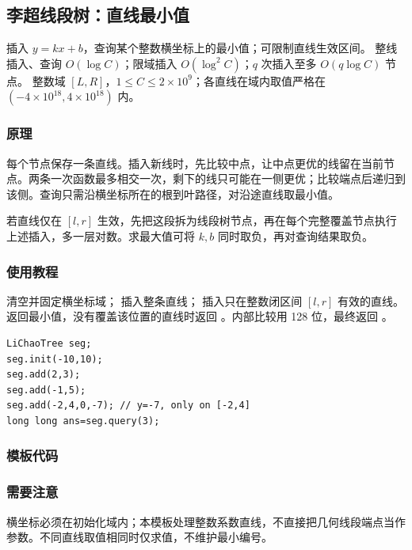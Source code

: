 \subsection{李超线段树：直线最小值}
\label{ds:li-chao}
\AlgorithmInfo
    {插入 $y=kx+b$，查询某个整数横坐标上的最小值；可限制直线生效区间。}
    {整线插入、查询 $O(\log C)$；限域插入 $O(\log^2 C)$；$q$ 次插入至多 $O(q\log C)$ 节点。}
    {整数域 $[L,R]$，$1\le C\le2\times10^9$；各直线在域内取值严格在 $(-4\times10^{18},4\times10^{18})$ 内。}
\subsubsection*{原理}
每个节点保存一条直线。插入新线时，先比较中点，让中点更优的线留在当前节点。两条一次函数最多相交一次，剩下的线只可能在一侧更优；比较端点后递归到该侧。查询只需沿横坐标所在的根到叶路径，对沿途直线取最小值。

若直线仅在 $[l,r]$ 生效，先把这段拆为线段树节点，再在每个完整覆盖节点执行上述插入，多一层对数。求最大值可将 $k,b$ 同时取负，再对查询结果取负。

\subsubsection*{使用教程}
 清空并固定横坐标域； 插入整条直线； 插入只在整数闭区间 $[l,r]$ 有效的直线。 返回最小值，没有覆盖该位置的直线时返回 。内部比较用 128 位，最终返回 。
\begin{lstlisting}[style=mtycpp,numbers=none]
LiChaoTree seg;
seg.init(-10,10);
seg.add(2,3);
seg.add(-1,5);
seg.add(-2,4,0,-7); // y=-7, only on [-2,4]
long long ans=seg.query(3);
\end{lstlisting}
\subsubsection*{模板代码}
\subsubsection*{需要注意}
横坐标必须在初始化域内；本模板处理整数系数直线，不直接把几何线段端点当作参数。不同直线取值相同时仅求值，不维护最小编号。
